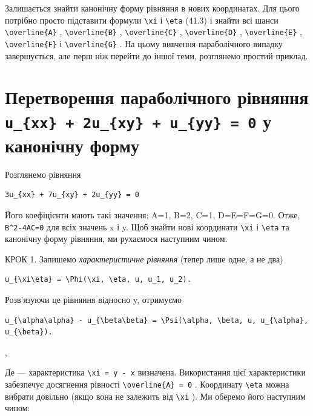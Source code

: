 \documentclass[
  ukrainian,
]{article}
\begin{document}
Залишається знайти канонічну форму рівняння в нових координатах. Для
цього потрібно просто підставити формули \texttt{\textbackslash{}xi} і
\texttt{\textbackslash{}eta} (41.3) і знайти всі шанси
\texttt{\textbackslash{}overline\{A\}} ,
\texttt{\textbackslash{}overline\{B\}} ,
\texttt{\textbackslash{}overline\{C\}} ,
\texttt{\textbackslash{}overline\{D\}} ,
\texttt{\textbackslash{}overline\{E\}} ,
\texttt{\textbackslash{}overline\{F\}} і
\texttt{\textbackslash{}overline\{G\}} . На цьому вивчення параболічного
випадку завершується, але перш ніж перейти до іншої теми, розглянемо
простий приклад.

\section{\texorpdfstring{Перетворення параболічного рівняння
\texttt{u\_\{xx\}\ +\ 2u\_\{xy\}\ +\ u\_\{yy\}\ =\ 0} у канонічну
форму}{Перетворення параболічного рівняння u\_\{xx\} + 2u\_\{xy\} + u\_\{yy\} = 0 у канонічну форму}}\label{ux43fux435ux440ux435ux442ux432ux43eux440ux435ux43dux43dux44f-ux43fux430ux440ux430ux431ux43eux43bux456ux447ux43dux43eux433ux43e-ux440ux456ux432ux43dux44fux43dux43dux44f-u_xx-2u_xy-u_yy-0-ux443-ux43aux430ux43dux43eux43dux456ux447ux43dux443-ux444ux43eux440ux43cux443}

Розглянемо рівняння

\begin{verbatim}
3u_{xx} + 7u_{xy} + 2u_{yy} = 0
\end{verbatim}

Його коефіцієнти мають такі значення: A=1, B=2, C=1, D=E=F=G=0. Отже,
\texttt{B\^{}2-4AC=0} для всіх значень x і y. Щоб знайти нові координати
\texttt{\textbackslash{}xi} і \texttt{\textbackslash{}eta} та канонічну
форму рівняння, ми рухаємося наступним чином.

КРОК 1. Запишемо \emph{характеристичне рівняння} (тепер лише одне, а не
два)

\begin{verbatim}
u_{\xi\eta} = \Phi(\xi, \eta, u, u_1, u_2).
\end{verbatim}

Розв'язуючи це рівняння відносно y, отримуємо

\begin{verbatim}
u_{\alpha\alpha} - u_{\beta\beta} = \Psi(\alpha, \beta, u, u_{\alpha}, u_{\beta}).
\end{verbatim}

,

Де --- характеристика \texttt{\textbackslash{}xi\ =\ y\ -\ x} визначена.
Використання цієї характеристики забезпечує досягнення рівності
\texttt{\textbackslash{}overline\{A\}\ =\ 0} . Координату
\texttt{\textbackslash{}eta} можна вибрати довільно (якщо вона не
залежить від \texttt{\textbackslash{}xi} ). Ми оберемо його наступним
чином:
\end{document}
